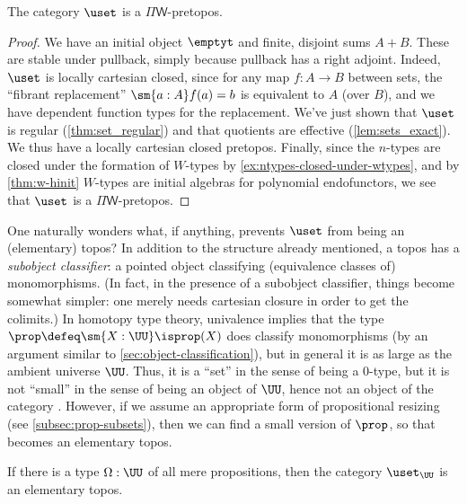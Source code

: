 \begin{thm}
  The category $\uset$ is a $\Pi\mathsf{W}$-pretopos.
\end{thm}
\begin{proof}
  We have an initial object
  $\emptyt$ and finite, disjoint sums $A+B$.  These are stable under pullback, simply because pullback has a right adjoint.  Indeed, $\uset$ is locally cartesian closed, since for any map $f:A\to B$ between sets, the ``fibrant replacement''  $\sm{a:A}f(a)=b$ is equivalent to $A$ (over $B$), and we have dependent function types for the replacement.
We've just shown that $\uset$ is regular (\cref{thm:set_regular}) and that quotients are effective (\cref{lem:sets_exact}). We thus have a locally cartesian closed pretopos. Finally, since the $n$-types are closed under the formation of $W$-types by \cref{ex:ntypes-closed-under-wtypes}, and by \cref{thm:w-hinit} $W$-types are initial algebras for polynomial endofunctors, we see that $\uset$ is a $\Pi\mathsf{W}$-pretopos.
\end{proof}


One naturally wonders what, if anything, prevents $\uset$ from being an (elementary) topos?
In addition to the structure already mentioned, a topos has a
\emph{subobject classifier}:
%
%
%
a pointed object classifying (equivalence classes of) monomorphisms.  (In fact, in the presence of a subobject
classifier, things become somewhat simpler: one merely needs cartesian closure in order to get the colimits.)
In homotopy type theory, univalence implies that the type $\prop \defeq \sm{X:\UU}\isprop(X)$ does classify monomorphisms (by an argument similar to \cref{sec:object-classification}), but in general it is as large as the ambient universe $\UU$.
Thus, it is a ``set'' in the sense of being a $0$-type, but it is not ``small'' in the sense of being an object of $\UU$, hence not an object of the category \uset.
However, if we assume an appropriate form of propositional resizing (see \cref{subsec:prop-subsets}), then we can find a small version of $\prop$, so that \uset becomes an elementary topos.

\begin{thm}\label{thm:settopos}
  If there is a type $\Omega:\UU$ of all mere propositions, then the category $\uset_\UU$ is an elementary topos.
\end{thm}

